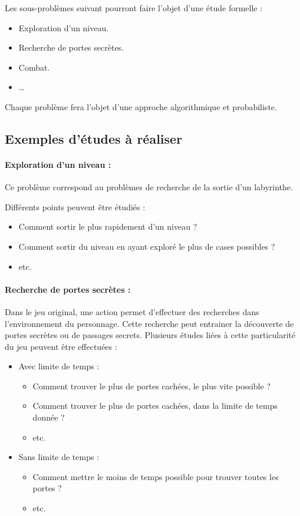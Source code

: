 \documentclass[12pt]{article}
\begin{document}
Les sous-problèmes suivant pourront faire l'objet d'une étude formelle : 
\begin{itemize}
	\item Exploration d'un niveau.
	\item Recherche de portes secrètes.
	\item Combat.
	\item \ldots
\end{itemize}

Chaque problème fera l'objet d'une approche algorithmique et probabiliste.

\subsection{Exemples d'études à réaliser}

\paragraph{Exploration d'un niveau :}

Ce problème correspond au problèmes de recherche de la sortie d'un labyrinthe.

Différents points peuvent être étudiés : 
\begin{itemize}
	\item Comment sortir le plus rapidement d'un niveau ? 
	\item Comment sortir du niveau en ayant exploré le plus de cases possibles ? 
	\item etc.
\end{itemize}


\paragraph{Recherche de portes secrètes :}

Dans le jeu original, une action permet d'effectuer des recherches dans l'environnement du personnage. Cette recherche peut entrainer la découverte de portes secrètes ou de passages secrets. Plusieurs études liées à cette particularité du jeu peuvent être effectuées : 
\begin{itemize}
	\item Avec limite de temps : 
	\begin{itemize}
		\item Comment trouver le plus de portes cachées, le plus vite possible ? 
		\item Comment trouver le plus de portes cachées, dans la limite de temps donnée ? 
		\item etc. 
	\end{itemize}
	\item Sans limite de temps : 
	\begin{itemize}
		\item Comment mettre le moins de temps possible pour trouver toutes les portes ? 
		\item etc.
	\end{itemize}
\end{itemize}
\end{document}
